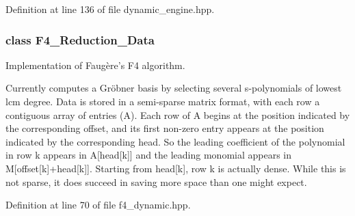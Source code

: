 Definition at line 136 of file dynamic\+\_\+engine.\+hpp.

\label{class_f4___reduction___data}
\subsubsection{class F4\+\_\+\+Reduction\+\_\+\+Data}
Implementation of Faug\`{e}re's F4 algorithm. 

Currently computes a Gr\"{o}bner basis by selecting several s-\/polynomials of lowest lcm degree. Data is stored in a semi-\/sparse matrix format, with each row a contiguous array of entries ({\ttfamily A}). Each row of {\ttfamily A} begins at the position indicated by the corresponding {\ttfamily offset}, and its first non-\/zero entry appears at the position indicated by the corresponding {\ttfamily head}. So the leading coefficient of the polynomial in row {\ttfamily k} appears in {\ttfamily A\mbox{[}head\mbox{[}k\mbox{]}\mbox{]}} and the leading monomial appears in {\ttfamily M\mbox{[}offset\mbox{[}k\mbox{]}+head\mbox{[}k\mbox{]}\mbox{]}}. Starting from {\ttfamily head\mbox{[}k\mbox{]}}, row {\ttfamily k} is actually dense. While this is not sparse, it does succeed in saving more space than one might expect. 

Definition at line 70 of file f4\+\_\+dynamic.\+hpp.

